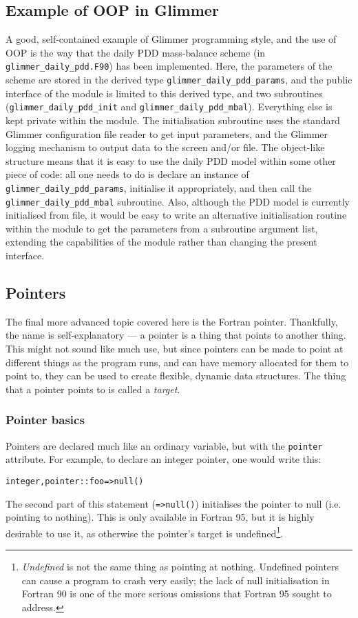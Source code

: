 \subsection{Example of OOP in Glimmer}
%
A good, self-contained example of Glimmer programming style, and the use of
OOP is the way that the daily PDD mass-balance scheme (in
\texttt{glimmer\_daily\_pdd.F90}) has been implemented. Here, the parameters
of the scheme are stored in the derived type
\texttt{glimmer\_daily\_pdd\_params}, and the public interface of the module
is limited to this derived type, and two subroutines
(\texttt{glimmer\_daily\_pdd\_init} and
\texttt{glimmer\_daily\_pdd\_mbal}). Everything else is kept private within
the module. The initialisation subroutine uses the standard Glimmer configuration
file reader to get input parameters, and the Glimmer logging mechanism to
output data to the screen and/or file. The object-like structure means that it
is easy to use the daily PDD model within some other piece of code: all one
needs to do is declare an instance of \texttt{glimmer\_daily\_pdd\_params},
initialise it appropriately, and then call the
\texttt{glimmer\_daily\_pdd\_mbal} subroutine. Also, although the PDD model is
currently initialised from file, it would be easy to write an
alternative initialisation routine within the module to get the parameters
from a subroutine argument list, extending the capabilities of the module
rather than changing the present interface.
%
\subsection{Pointers}
%
The final more advanced topic covered here is the Fortran pointer. Thankfully,
the name is self-explanatory --- a pointer is a thing that points to another
thing. This might not sound like much use, but since pointers can be made to
point at different things as the program runs, and can have memory allocated
for them to point to, they can be used to create flexible, dynamic data
structures. The thing that a pointer points to is called a \emph{target}.
%
\subsubsection{Pointer basics}
%
Pointers are declared much like an ordinary variable, but with the \texttt{pointer}
attribute. For example, to declare an integer pointer, one would write this:
%
\begin{alltt}
    integer, pointer :: foo => null()
\end{alltt}
%
The second part of this statement (\texttt{=>null()}) initialises the pointer
to null (i.e. pointing to nothing). This is only available in Fortran 95, but
it is highly desirable to use it, as otherwise the pointer's target is
undefined\footnote{\emph{Undefined} is not the same thing as pointing at
  nothing. Undefined pointers can cause a program to crash very easily; the
  lack of null initialisation in Fortran 90 is one of the more serious
  omissions that Fortran 95 sought to address.}.

